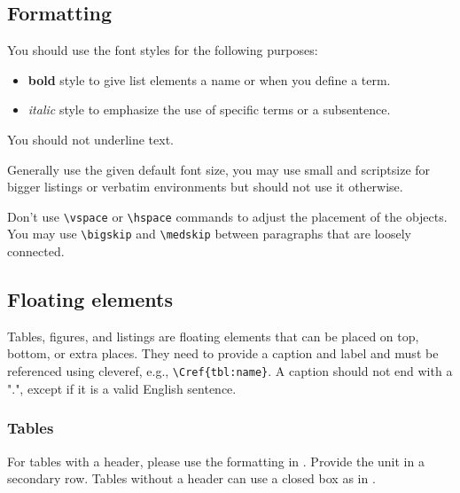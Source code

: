 \documentclass{jhps}
\begin{document}
\subsection{Formatting}
You should use the font styles for the following purposes:
\begin{itemize}
  \item \textbf{bold} style to give list elements a name or when you define a term.
  \item \textit{italic} style to emphasize the use of specific terms or a subsentence.
\end{itemize}
You should not underline text.

\medskip

Generally use the given default font size, you may use small and scriptsize for bigger listings or verbatim environments but should not use it otherwise.

\medskip

Don't use \verb|\vspace| or \verb|\hspace| commands to adjust the placement of the objects.
You may use \verb|\bigskip| and \verb|\medskip| between paragraphs that are loosely connected.

\subsection{Floating elements}
Tables, figures, and listings are floating elements that can be placed on top, bottom, or extra places.
They need to provide a caption and label and must be referenced using cleveref, e.g., \verb|\Cref{tbl:name}|.
A caption should not end with a ".", except if it is a valid English sentence.

\subsubsection{Tables}

For tables with a header, please use the formatting in .
Provide the unit in a secondary row.
Tables without a header can use a closed box as in .
\end{document}
